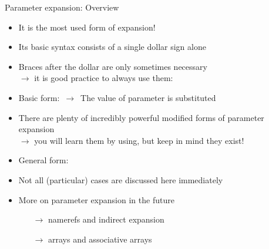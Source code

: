 \begin{frame}{Parameter expansion: Overview}
    \begin{itemize}
        \item It is the most used form of expansion!
        \item Its basic syntax consists of a single dollar sign alone
        \item Braces after the dollar are only sometimes necessary\\
              $\to$ it is good practice to always use them: \PP{\texttt{\$\{\ldots\}}}
        \item Basic form:  $\,\to\,$ The value of parameter is substituted
        \item There are plenty of incredibly powerful modified forms of parameter expansion\\
              $\to$ you will learn them by using, but \alert{keep in mind they exist}!
        \item General form: 
        \item Not all (particular) cases are discussed here immediately
        \item More on parameter expansion in the future\\
              \begin{itemize}
                  \item[$\to$] namerefs and indirect expansion
                  \item[$\to$] arrays and associative arrays
              \end{itemize}
    \end{itemize}
    \PrepareURLsymbol[PB]
\end{frame}
